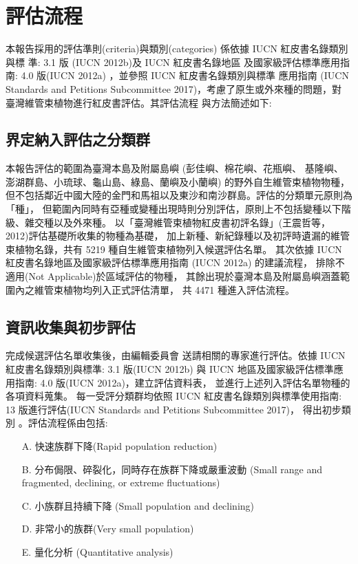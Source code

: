 \chapter{評估流程}
\begin{multicols}{2}

本報告採用的評估準則(criteria)與類別(categories) 係依據 IUCN 紅皮書名錄類別與標 準: 3.1 版 (IUCN 2012b)及 IUCN 紅皮書名錄地區 及國家級評估標準應用指南: 4.0 版(IUCN 2012a) ，並參照 IUCN 紅皮書名錄類別與標準 應用指南 (IUCN Standards and Petitions Subcommittee 2017)，考慮了原生或外來種的問題，對 臺灣維管束植物進行紅皮書評估。其評估流程 與方法簡述如下:
\end{multicols}
\section{界定納入評估之分類群}
\begin{multicols}{2}
本報告評估的範圍為臺灣本島及附屬島嶼 (彭佳嶼、棉花嶼、花瓶嶼、
基隆嶼、澎湖群島、小琉球、龜山島、綠島、蘭嶼及小蘭嶼) 的野外自生維管束植物物種，
但不包括鄰近中國大陸的金門和馬祖以及東沙和南沙群島。評估的分類單元原則為「種」，
但範圍內同時有亞種或變種出現時則分別評估，原則上不包括變種以下階級、雜交種以及外來種。
以「臺灣維管束植物紅皮書初評名錄」(王震哲等，2012)評估基礎所收集的物種為基礎，
加上新種、新紀錄種以及初評時遺漏的維管束植物名錄，共有 5219 種自生維管束植物列入候選評估名單。
其次依據 IUCN 紅皮書名錄地區及國家級評估標準應用指南 (IUCN 2012a) 的建議流程，
排除不適用(Not Applicable)於區域評估的物種，
其餘出現於臺灣本島及附屬島嶼涵蓋範圍內之維管束植物均列入正式評估清單，
共 4471 種進入評估流程。
\end{multicols}
\section{資訊收集與初步評估}
\begin{multicols}{2}
完成候選評估名單收集後，由編輯委員會
送請相關的專家進行評估。依據 IUCN 紅皮書名錄類別與標準: 3.1 版(IUCN 2012b) 與
IUCN 地區及國家級評估標準應用指南: 4.0 版(IUCN 2012a)，建立評估資料表，
並進行上述列入評估名單物種的各項資料蒐集。
每一受評分類群均依照 IUCN 紅皮書名錄類別與標準使用指南:
13 版進行評估(IUCN Standards and Petitions Subcommittee 2017)，
得出初步類別 。評估流程係由包括:
\end{multicols}
\begin{enumerate}
    \item[A. ] 快速族群下降(Rapid population reduction) \\
    \item[B. ] 分布侷限、碎裂化，同時存在族群下降或嚴重波動 (Small range and fragmented, declining, or extreme fluctuations) \\
    \item[C. ] 小族群且持續下降 (Small population and declining) \\
    \item[D. ] 非常小的族群(Very small population) \\
    \item[E. ] 量化分析 (Quantitative analysis) \\
\end{enumerate}

